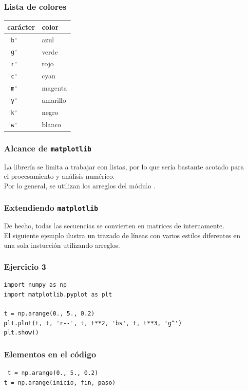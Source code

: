 \begin{frame}[fragile]
\frametitle{Lista de colores}
\fontsize{10}{10}\selectfont
\begin{tabular}{l | l}
carácter & color \\ \hline
\verb|'b'| & azul \\ \hline
\verb|'g'| & verde \\ \hline
\verb|'r'| & rojo \\ \hline
\verb|'c'| & cyan \\ \hline
\verb|'m'| & magenta \\ \hline
\verb|'y'| & amarillo \\ \hline
\verb|'k'| & negro \\ \hline
\verb|'w'| & blanco
\end{tabular}
\end{frame}
\begin{frame}
\frametitle{Alcance de \texttt{matplotlib}}
La librería  se limita a trabajar con listas, por lo que sería bastante acotado para el procesamiento y análisis numérico.
\\
\medskip
Por lo general, se utilizan los arreglos del módulo .
\end{frame}
\begin{frame}
\frametitle{Extendiendo \texttt{matplotlib}}
De hecho, todas las secuencias se convierten en matrices de  internamente.
\\
\medskip
El siguiente ejemplo ilustra un trazado de líneas con varios estilos diferentes en una sola instucción utilizando arreglos.
\end{frame}
\begin{frame}[fragile]
\frametitle{Ejercicio 3}
\begin{lstlisting}[caption=Gráfica con \texttt{numpy},basicstyle=\linespread{1.2}\ttfamily\small, columns=fullflexible]
import numpy as np
import matplotlib.pyplot as plt

t = np.arange(0., 5., 0.2)
plt.plot(t, t, 'r--', t, t**2, 'bs', t, t**3, 'g^')
plt.show()
\end{lstlisting}
\end{frame}
\begin{frame}[fragile]
\frametitle{Elementos en el código}
\texttt{
t = np.arange(0., 5., 0.2)
\\
\bigskip
\vspace{1.5cm}
t = np.arange(inicio, fin, paso)
}
\end{frame}

